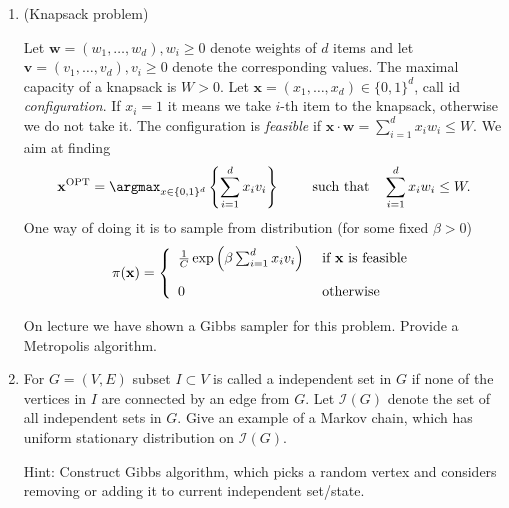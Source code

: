 \documentclass[a4paper,12pt]{article}
\begin{document}
\begin{enumerate}
 \item (Knapsack problem)
 
 
 Let $\mathbf{w}=(w_1,\ldots,w_d), w_i\geq 0 $ 
 denote weights of $d$ items and let $\mathbf{v}=(v_1,\ldots,v_d), v_i\geq 0 $ 
 denote the corresponding values.  The maximal capacity of a knapsack is $W>0$.
 Let $\mathbf{x}=(x_1,\ldots,x_d)\in\{0,1\}^d$, call id \textsl{configuration}. If $x_i=1$ it means we take $i$-th item 
 to the knapsack, otherwise we do not take it. 
 The configuration is \textsl{feasible} if $\displaystyle\mathbf{x}\cdot \mathbf{w}=\sum_{i=1}^d x_iw_i\leq W$.
 We aim at finding 
 $$\mathbf{x}^{\rm OPT} = \argmax_{x\in\{0,1\}^d}\left\{ \sum_{i=1}^d x_i v_i\right\}
 \qquad \ \textrm{such that} \quad   \sum_{i=1}^d x_i w_i \leq W.$$
 One way of doing it is to sample from distribution (for some fixed $\beta>0$)
 $$\pi(\mathbf{x})
 =\left\{
\begin{array}{lll}
 {1\over C} \exp\left(\beta \sum_{i=1}^d x_i v_i\right) & \textrm{ if } \mathbf{x} \textrm{ is feasible}\\[12pt]
 0 & \textrm{ otherwise }
\end{array}
\right.$$

On lecture we have shown a Gibbs sampler for this problem. Provide a Metropolis algorithm.

\item  For $G=(V,E)$ subset $I\subset V$ is called a independent set in $G$ if none of the vertices in $I$ are connected by an edge from $G.$ Let $\mathcal{I}(G)$ denote the set of all independent sets in $G.$ Give an example of a Markov chain, which has uniform stationary distribution on $\mathcal{I}(G)$. \smallskip\par 
{\footnotesize Hint: Construct Gibbs algorithm, which picks a random vertex and considers removing or adding it to current independent set/state. }
 


\newpage


\end{enumerate}
\end{document}
